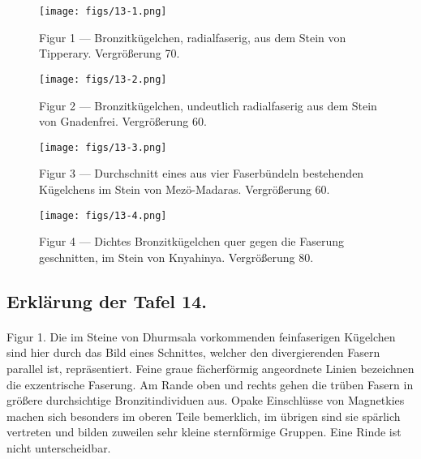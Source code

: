 \documentclass[a4paper, 12pt, oneside]{article}
\begin{document}
\vspace*{\fill}
\begin{figure}[H]
\centering
\texttt{[image: figs/13-1.png]}
\caption{\small Figur 1 --- Bronzitkügelchen, radialfaserig, aus dem Stein von Tipperary. Vergrößerung 70.}
\end{figure}
\vspace*{\fill}
\clearpage

\vspace*{\fill}
\begin{figure}[H]
\centering
\texttt{[image: figs/13-2.png]}
\caption{\small Figur 2 --- Bronzitkügelchen, undeutlich radialfaserig aus dem Stein von Gnadenfrei. Vergrößerung 60.}
\end{figure}
\vspace*{\fill}
\clearpage

\vspace*{\fill}
\begin{figure}[H]
\centering
\texttt{[image: figs/13-3.png]}
\caption{\small Figur 3 --- Durchschnitt eines aus vier Faserbündeln bestehenden Kügelchens im Stein von Mezö-Madaras. Vergrößerung 60.}
\end{figure}
\vspace*{\fill}
\clearpage

\vspace*{\fill}
\begin{figure}[H]
\centering
\texttt{[image: figs/13-4.png]}
\caption{\small Figur 4 --- Dichtes Bronzitkügelchen quer gegen die Faserung geschnitten, im Stein von Knyahinya. Vergrößerung 80.}
\end{figure}
\vspace*{\fill}
\clearpage

\subsection{Erklärung der Tafel 14.}
\paragraph{}
Figur 1. Die im Steine von Dhurmsala vorkommenden feinfaserigen Kügelchen sind hier durch das Bild eines Schnittes, welcher den divergierenden Fasern parallel ist, repräsentiert. Feine graue fächerförmig angeordnete Linien bezeichnen die exzentrische Faserung. Am Rande oben und rechts gehen die trüben Fasern in größere durchsichtige Bronzitindividuen aus. Opake Einschlüsse von Magnetkies machen sich besonders im oberen Teile bemerklich, im übrigen sind sie spärlich vertreten und bilden zuweilen sehr kleine sternförmige Gruppen. Eine Rinde ist nicht unterscheidbar.
\end{document}
